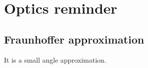 \documentclass[../main/main.tex]{subfiles}
\begin{document}
\chapter{Optics reminder}


\section{Fraunhoffer approximation}

It is a small angle approximation\cite{wiki:Fraunhofer_diffraction}.

\chapterreferences
\end{document}
